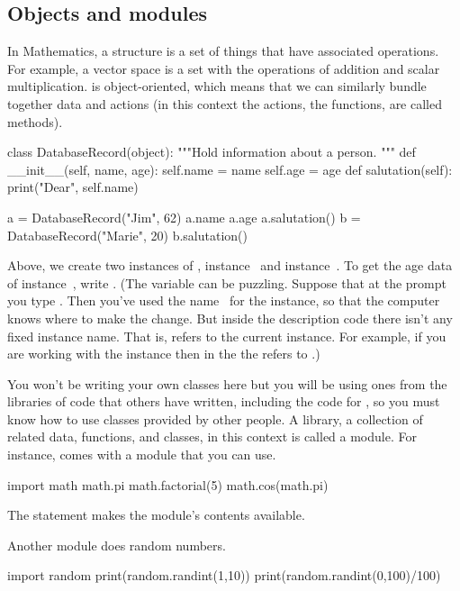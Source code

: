 \subsection{Objects and modules}
In Mathematics, a structure is a set of things that have associated operations.
For example, a vector space is a set with the operations
of addition and scalar multiplication.
\python{} is object-oriented, which means that we can similarly bundle
together data and actions (in this context the actions, the functions, 
are called methods).
\begin{pythonconsole}
class DatabaseRecord(object):
    """Hold information about a person.
    """
    def __init__(self, name, age):
        self.name = name
        self.age = age
    def salutation(self):
        print("Dear", self.name)

a = DatabaseRecord("Jim", 62)
a.name
a.age
a.salutation()
b = DatabaseRecord("Marie", 20)
b.salutation()
\end{pythonconsole}
Above, we create two instances of 
, instance~ and
instance~.
To get the age data of instance~, write 
.
(The \protect{} variable 
can be puzzling.
Suppose that at the prompt you type .
Then you've used the name~ 
for the instance, so that the computer knows where to
make the change.
But
inside the  description code there isn't any fixed instance name.
That is,  refers to the current instance. 
For example, if you are working with the instance  then 
in the  the  refers
to .)

You won't be writing your own classes here 
but you will be using ones from
the libraries of code that others have written, including the
code for \Sage, so you must know how to use 
classes provided by other people.
A library, a collection of related data, functions, and classes, in this context
is called a module.
For instance, \python{} comes with a  module that you can use.
\begin{pythonconsole}
import math
math.pi
math.factorial(5)
math.cos(math.pi)
\end{pythonconsole}
The  statement makes the module's
contents available.

Another module does random numbers.
\begin{pythonconsole}
import random
print(random.randint(1,10))
print(random.randint(0,100)/100)
\end{pythonconsole}



